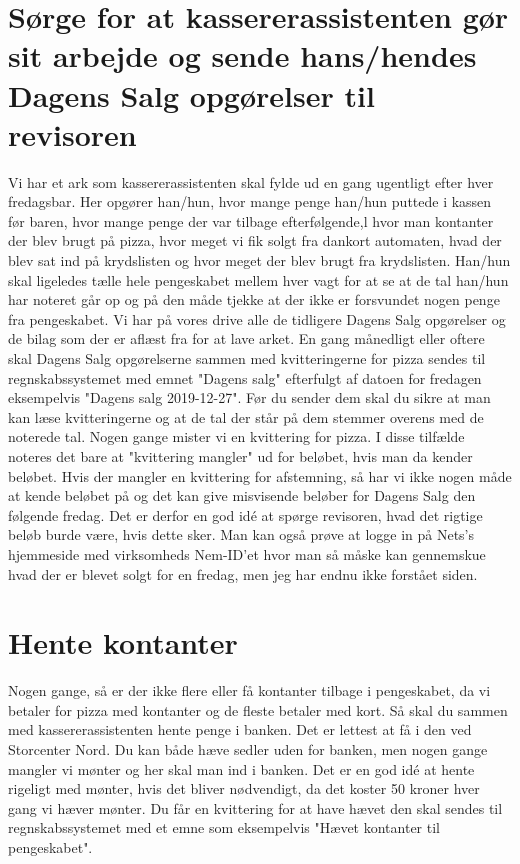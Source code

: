 \section{Sørge for at kassererassistenten gør sit arbejde og sende hans/hendes Dagens Salg opgørelser til revisoren}
Vi har et ark som kassererassistenten skal fylde ud en gang ugentligt efter hver fredagsbar. Her opgører han/hun, hvor mange penge han/hun puttede i kassen før baren, hvor mange penge der var tilbage efterfølgende,l hvor man kontanter der blev brugt på pizza, hvor meget vi fik solgt fra dankort automaten, hvad der blev sat ind på krydslisten og hvor meget der blev brugt fra krydslisten. Han/hun skal ligeledes tælle hele pengeskabet mellem hver vagt for at se at de tal han/hun har noteret går op og på den måde tjekke at der ikke er forsvundet nogen penge fra pengeskabet. Vi har på vores drive alle de tidligere Dagens Salg opgørelser og de bilag som der er aflæst fra for at lave arket. En gang månedligt eller oftere skal Dagens Salg opgørelserne sammen med kvitteringerne for pizza sendes til regnskabssystemet med emnet "Dagens salg" efterfulgt af datoen for fredagen eksempelvis "Dagens salg 2019-12-27". Før du sender dem skal du sikre at man kan læse kvitteringerne og at de tal der står på dem stemmer overens med de noterede tal. Nogen gange mister vi en kvittering for pizza. I disse tilfælde noteres det bare at "kvittering mangler" ud for beløbet, hvis man da kender beløbet. Hvis der mangler en kvittering for afstemning, så har vi ikke nogen måde at kende beløbet på og det kan give misvisende beløber for Dagens Salg den følgende fredag. Det er derfor en god idé at spørge revisoren, hvad det rigtige beløb burde være, hvis dette sker. Man kan også prøve at logge in på Nets's hjemmeside med virksomheds Nem-ID'et hvor man så måske kan gennemskue hvad der er blevet solgt for en fredag, men jeg har endnu ikke forstået siden.

\section{Hente kontanter}
Nogen gange, så er der ikke flere eller få kontanter tilbage i pengeskabet, da vi betaler for pizza med kontanter og de fleste betaler med kort. Så skal du sammen med kassererassistenten hente penge i banken. Det er lettest at få i den ved Storcenter Nord. Du kan både hæve sedler uden for banken, men nogen gange mangler vi mønter og her skal man ind i banken. Det er en god idé at hente rigeligt med mønter, hvis det bliver nødvendigt, da det koster 50 kroner hver gang vi hæver mønter. Du får en kvittering for at have hævet den skal sendes til regnskabssystemet med et emne som eksempelvis "Hævet kontanter til pengeskabet".

